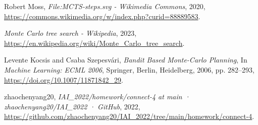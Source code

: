 \documentclass[UTF8]{ctexart}
\begin{document}
\begin{thebibliography}{99}
    Robert Moss,
    \emph{File:MCTS-steps.svg - Wikimedia Commons},
    2020,
    \url{https://commons.wikimedia.org/w/index.php?curid=88889583}.
    
    \emph{Monte Carlo tree search - Wikipedia},
    2023,
    \url{https://en.wikipedia.org/wiki/Monte_Carlo_tree_search}.
    
    Levente Kocsis and Csaba Szepesvári,
    \emph{Bandit Based Monte-Carlo Planning},
    In \emph{Machine Learning: ECML 2006},
    Springer, Berlin, Heidelberg, 2006,
    pp. 282--293,
    \url{https://doi.org/10.1007/11871842_29}.
    
    zhaochenyang20,
    \emph{IAI\_2022/homework/connect-4 at main · zhaochenyang20/IAI\_2022 · GitHub},
    2022,
    \url{https://github.com/zhaochenyang20/IAI_2022/tree/main/homework/connect-4}.
\end{thebibliography}
\end{document}
